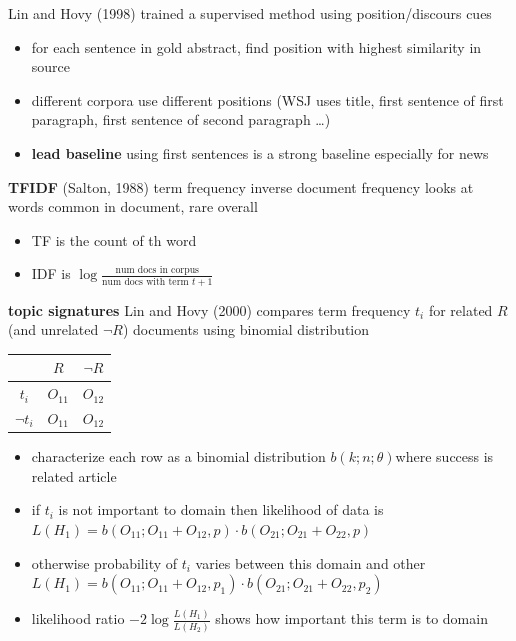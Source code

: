 \documentclass[]{article}
\theoremstyle{definition}
\begin{document}
Lin and Hovy (1998) trained a supervised method using position/discours cues
\begin{itemize}
    \item for each sentence in gold abstract, find position with highest similarity in source
    \item different corpora use different positions (WSJ uses title, first sentence of first paragraph, first sentence of second paragraph \ldots)
    \item \textbf{lead baseline} using first sentences is a strong baseline especially for news
\end{itemize}

\textbf{TFIDF} (Salton, 1988) term frequency inverse document frequency looks at words common in document, rare overall
\begin{itemize}
    \item TF is the count of th word
    \item IDF is $\log \frac{\text{num docs in corpus}}{\text{num docs with term } t + 1}$
\end{itemize}

\textbf{topic signatures} Lin and Hovy (2000) compares term frequency $t_i$ for related $R$ (and unrelated $\neg R$) documents using binomial distribution

\begin{table}[h]
    \centering
    \label{tab:label}
    \begin{tabular}{c|c|c}
                    & $R$       & $\neg R$ \\ \hline
        $t_i$       & $O_{11}$  & $O_{12}$  \\ \hline
        $\neg t_i$  & $O_{11}$  & $O_{12}$
    \end{tabular}
\end{table}

\begin{itemize}
    \item characterize each row as a binomial distribution $b(k;n;\theta)$where success is related article
    \item if $t_i$ is not important to domain then likelihood of data is \\ $L(H_1) = b(O_{11}; O_{11} + O_{12}, p) \cdot b(O_{21}; O_{21} + O_{22}, p)$
    \item otherwise probability of $t_i$ varies between this domain and other \\
    $L(H_1) = b(O_{11}; O_{11} + O_{12}, p_1) \cdot b(O_{21}; O_{21} + O_{22}, p_2)$
\item likelihood ratio $- 2 \log \frac{L(H_1)}{L(H_2)} $ shows how important this term is to domain
\end{itemize}
\end{document}
